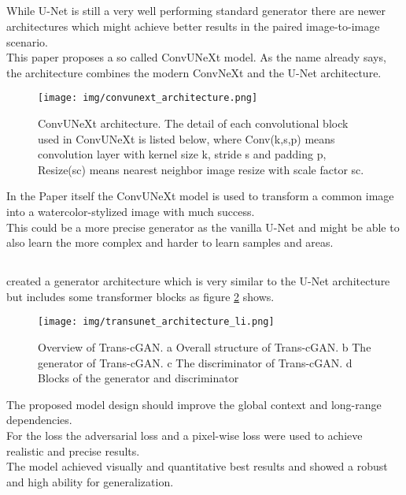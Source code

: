 		\subsection{}
			While U-Net \cite{ronneberger_u-net_2015} is still a very well performing standard generator there are newer architectures which might achieve better results in the paired image-to-image scenario.\\
			This paper proposes a so called ConvUNeXt model. As the name already says, the architecture combines the modern ConvNeXt and the U-Net architecture.
			\begin{figure}[H]
				\centering
				\texttt{[image: img/convunext\_architecture.png]}
				\caption[ConvUNeXt Architecture]{ConvUNeXt architecture. The detail of each convolutional block used in ConvUNeXt is listed below, where Conv(k,s,p) means convolution layer with kernel size k, stride s and padding p, Resize(sc) means nearest neighbor image resize with scale factor sc.}
				\label{fig:convunext}
			\end{figure}
			\FloatBarrier
			In the Paper itself the ConvUNeXt model is used to transform a common image into a watercolor-stylized image with much success.\\
			This could be a more precise generator as the vanilla U-Net and might be able to also learn the more complex and harder to learn samples and areas.
			
		\subsection{}
			\citeauthor{li_trans-cgan_2023} created a generator architecture which is very similar to the U-Net architecture but includes some transformer blocks as figure \ref{fig:transcgan} shows.
			\begin{figure}[H]
				\centering
				\texttt{[image: img/transunet\_architecture\_li.png]}
				\caption[Trans-cGAN Architecture]{Overview of Trans-cGAN. a Overall structure of Trans-cGAN. b The generator of Trans-cGAN. c The discriminator of Trans-cGAN. d Blocks of the generator and discriminator}
				\label{fig:transcgan}
			\end{figure}
			\FloatBarrier
			The proposed model design should improve the global context and long-range dependencies.\\
			For the loss the adversarial loss and a pixel-wise loss were used to achieve realistic and precise results.\\
			The model achieved visually and quantitative best results and showed a robust and high ability for generalization.
			
